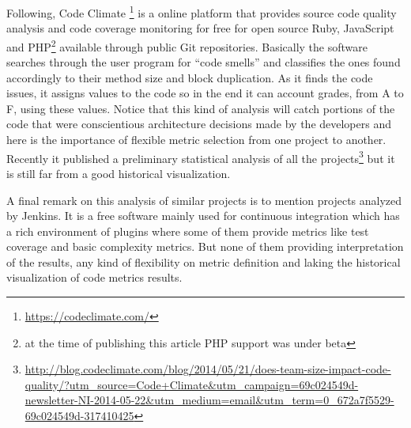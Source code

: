 Following, Code Climate \footnote{\url{https://codeclimate.com/}} is a online platform that provides source code quality analysis and code coverage monitoring for free for open source Ruby, JavaScript and PHP\footnote{at the time of publishing this article PHP support was under beta} available through public Git repositories. Basically the software searches through the user program for ``code smells'' and classifies the ones found accordingly to their method size and block duplication. As it finds the code issues, it assigns values to the code so in the end it can account grades, from A to F, using these values. Notice that this kind of analysis will catch portions of the code that were conscientious architecture decisions made by the developers and here is the importance of flexible metric selection from one project to another. Recently it published a preliminary statistical analysis of all the projects\footnote{\url{http://blog.codeclimate.com/blog/2014/05/21/does-team-size-impact-code-quality/?utm_source=Code+Climate&utm_campaign=69c024549d-newsletter-NI-2014-05-22&utm_medium=email&utm_term=0_672a7f5529-69c024549d-317410425}} but it is still far from a good historical visualization.

A final remark on this analysis of similar projects is to mention projects analyzed by Jenkins. It is a free software mainly used for continuous integration which has a rich environment of plugins where some of them provide metrics like test coverage and basic complexity metrics. But none of them providing interpretation of the results, any kind of flexibility on metric definition and laking the historical visualization of code metrics results.
